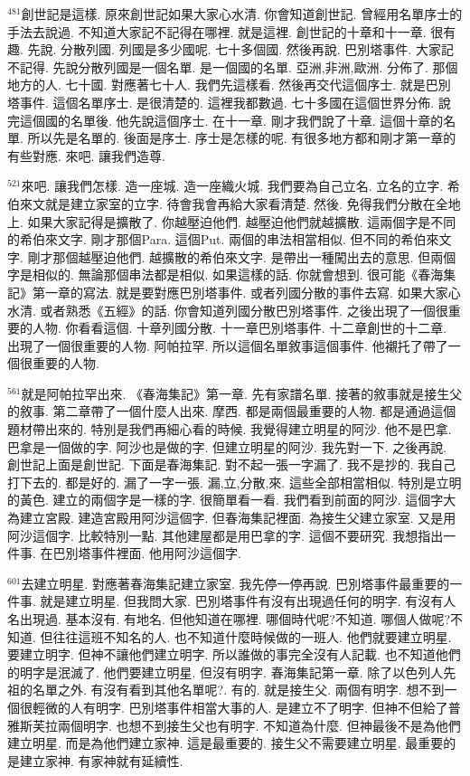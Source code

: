 \documentclass{book}
\begin{document}
$^{481}$創世記是這樣.
原來創世記如果大家心水清.
你會知道創世記.
曾經用名單序士的手法去說過.
不知道大家記不記得在哪裡.
就是這裡.
創世記的十章和十一章.
很有趣.
先說.
分散列國.
列國是多少國呢.
七十多個國.
然後再說.
巴別塔事件.
大家記不記得.
先說分散列國是一個名單.
是一個國的名單.
亞洲,非洲,歐洲.
分佈了.
那個地方的人.
七十國.
對應著七十人.
我們先這樣看.
然後再交代這個序士.
就是巴別塔事件.
這個名單序士.
是很清楚的.
這裡我都數過.
七十多國在這個世界分佈.
說完這個國的名單後.
他先說這個序士.
在十一章.
剛才我們說了十章.
這個十章的名單.
所以先是名單的.
後面是序士.
序士是怎樣的呢.
有很多地方都和剛才第一章的有些對應.
來吧.
讓我們造尊.

$^{521}$來吧.
讓我們怎樣.
造一座城.
造一座織火城.
我們要為自己立名.
立名的立字.
希伯來文就是建立家室的立字.
待會我會再給大家看清楚.
然後.
免得我們分散在全地上.
如果大家記得是擴散了.
你越壓迫他們.
越壓迫他們就越擴散.
這兩個字是不同的希伯來文字.
剛才那個Para.
這個Put.
兩個的串法相當相似.
但不同的希伯來文字.
剛才那個越壓迫他們.
越擴散的希伯來文字.
是帶出一種闖出去的意思.
但兩個字是相似的.
無論那個串法都是相似.
如果這樣的話.
你就會想到.
很可能《春海集記》第一章的寫法.
就是要對應巴別塔事件.
或者列國分散的事件去寫.
如果大家心水清.
或者熟悉《五經》的話.
你會知道列國分散巴別塔事件.
之後出現了一個很重要的人物.
你看看這個.
十章列國分散.
十一章巴別塔事件.
十二章創世的十二章.
出現了一個很重要的人物.
阿帕拉罕.
所以這個名單敘事這個事件.
他襯托了帶了一個很重要的人物.

$^{561}$就是阿帕拉罕出來.
《春海集記》第一章.
先有家譜名單.
接著的敘事就是接生父的敘事.
第二章帶了一個什麼人出來.
摩西.
都是兩個最重要的人物.
都是通過這個題材帶出來的.
特別是我們再細心看的時候.
我覺得建立明星的阿沙.
他不是巴拿.
巴拿是一個做的字.
阿沙也是做的字.
但建立明星的阿沙.
我先對一下.
之後再說.
創世記上面是創世記.
下面是春海集記.
對不起一張一字漏了.
我不是抄的.
我自己打下去的.
都是好的.
漏了一字一張.
漏,立,分散,來.
這些全部相當相似.
特別是立明的黃色.
建立的兩個字是一樣的字.
很簡單看一看.
我們看到前面的阿沙.
這個字大為建立宮殿.
建造宮殿用阿沙這個字.
但春海集記裡面.
為接生父建立家室.
又是用阿沙這個字.
比較特別一點.
其他建屋都是用巴拿的字.
這個不要研究.
我想指出一件事.
在巴別塔事件裡面.
他用阿沙這個字.

$^{601}$去建立明星.
對應著春海集記建立家室.
我先停一停再說.
巴別塔事件最重要的一件事.
就是建立明星.
但我問大家.
巴別塔事件有沒有出現過任何的明字.
有沒有人名出現過.
基本沒有.
有地名.
但他知道在哪裡.
哪個時代呢?不知道.
哪個人做呢?不知道.
但往往這班不知名的人.
也不知道什麼時候做的一班人.
他們就要建立明星.
要建立明字.
但神不讓他們建立明字.
所以誰做的事完全沒有人記載.
也不知道他們的明字是泯滅了.
他們要建立明星.
但沒有明字.
春海集記第一章.
除了以色列人先祖的名單之外.
有沒有看到其他名單呢?.
有的.
就是接生父.
兩個有明字.
想不到一個很輕微的人有明字.
巴別塔事件相當大事的人.
是建立不了明字.
但神不但給了普雅斯芙拉兩個明字.
也想不到接生父也有明字.
不知道為什麼.
但神最後不是為他們建立明星.
而是為他們建立家神.
這是最重要的.
接生父不需要建立明星.
最重要的是建立家神.
有家神就有延續性.
\end{document}
